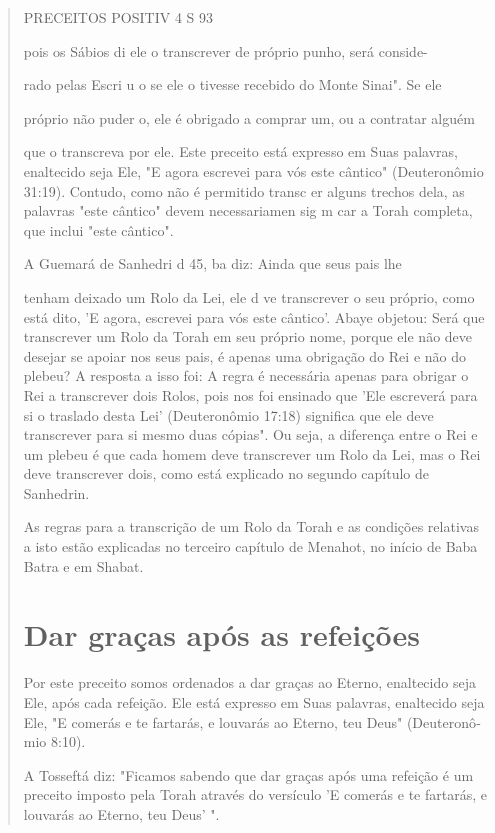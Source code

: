 \begin{quote}
PRECEITOS POSITIV 4 S 93

pois os Sábios di ele o transcrever de próprio punho, será conside-

rado pelas Escri u o se ele o tivesse recebido do Monte Sinai". Se ele

próprio não puder o, ele é obrigado a comprar um, ou a contratar alguém

que o transcreva por ele. Este preceito está expresso em Suas palavras,
enalte­cido seja Ele, "E agora escrevei para vós este cântico"
(Deuteronômio 31:19). Contudo, como não é permitido transc er alguns
trechos dela, as palavras "este cântico" devem necessariamen sig m car a
Torah completa, que inclui "este cântico".

A Guemará de Sanhedri d 45, ba diz: Ainda que seus pais lhe

tenham deixado um Rolo da Lei, ele d ve transcrever o seu próprio, como
está dito, 'E agora, escrevei para vós este cântico'. Abaye objetou:
Será que trans­crever um Rolo da Torah em seu próprio nome, porque ele
não deve desejar se apoiar nos seus pais, é apenas uma obrigação do Rei
e não do plebeu? A res­posta a isso foi: A regra é necessária apenas
para obrigar o Rei a transcrever dois Rolos, pois nos foi ensinado que
'Ele escreverá para si o traslado desta Lei' (Deu­teronômio 17:18)
significa que ele deve transcrever para si mesmo duas cópias". Ou seja,
a diferença entre o Rei e um plebeu é que cada homem deve transcre­ver
um Rolo da Lei, mas o Rei deve transcrever dois, como está explicado no
segundo capítulo de Sanhedrin.

As regras para a transcrição de um Rolo da Torah e as condições
re­lativas a isto estão explicadas no terceiro capítulo de Menahot, no
início de Ba­ba Batra e em Shabat.

\section{Dar graças após as refeições}

Por este preceito somos ordenados a dar graças ao Eterno, enalteci­do
seja Ele, após cada refeição. Ele está expresso em Suas palavras,
enaltecido seja Ele, "E comerás e te fartarás, e louvarás ao Eterno, teu
Deus" (Deuteronô­mio 8:10).

A Tosseftá diz: "Ficamos sabendo que dar graças após uma refeição é um
preceito imposto pela Torah através do versículo 'E comerás e te
fartarás, e louvarás ao Eterno, teu Deus' ".


\end{quote}
